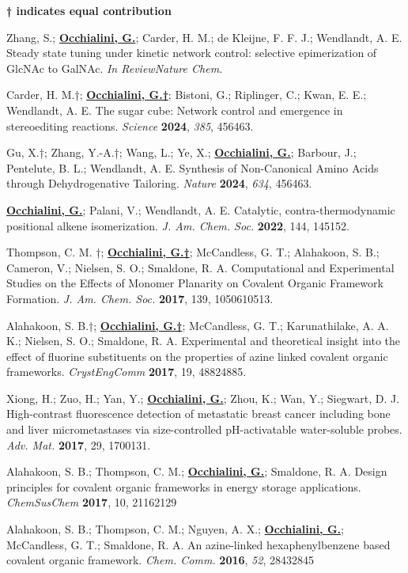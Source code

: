 
\begin{rSection}{}

  \textbf{† indicates equal contribution}

  Zhang, S.; \underline{\textbf{Occhialini, G.}}; Carder, H. M.; de Kleijne, F. F. J.; Wendlandt, A. E. Steady state tuning under kinetic network control: selective epimerization of GlcNAc to GalNAc. \textit{In Review\textemdash{}Nature Chem.}

  Carder, H. M.†; \underline{\textbf{Occhialini, G.†}}; Bistoni, G.; Riplinger, C.; Kwan, E. E.; Wendlandt, A. E. The sugar cube: Network control and emergence in stereoediting reactions. \textit{Science} \textbf{2024}, \textit{385}, 456\textemdash{}463.
  
  Gu, X.†; Zhang, Y.-A.†; Wang, L.; Ye, X.; \underline{\textbf{Occhialini, G.}}; Barbour, J.; Pentelute, B. L.; Wendlandt, A. E. Synthesis of Non-Canonical Amino Acids through Dehydrogenative Tailoring. \textit{Nature} \textbf{2024}, \textit{634}, 456\textemdash{}463.
  
  \underline{\textbf{Occhialini, G.}}; Palani, V.; Wendlandt, A. E. Catalytic, contra-thermodynamic positional alkene isomerization. \textit{J. Am. Chem. Soc.} \textbf{2022}, 144, 145\textemdash{}152.
  
  Thompson, C. M. †; \underline{\textbf{Occhialini, G.†}}; McCandless, G. T.; Alahakoon, S. B.; Cameron, V.; Nielsen, S. O.; Smaldone, R. A. Computational and Experimental Studies on the Effects of Monomer Planarity on Covalent Organic Framework Formation. \textit{J. Am. Chem. Soc.} \textbf{2017}, 139, 10506\textemdash{}10513.
  
  Alahakoon, S. B.†; \underline{\textbf{Occhialini, G.†}}; McCandless, G. T.; Karunathilake, A. A. K.; Nielsen, S. O.; Smaldone, R. A. Experimental and theoretical insight into the effect of fluorine substituents on the properties of azine linked covalent organic frameworks. \textit{CrystEngComm} \textbf{2017}, 19, 4882\textemdash{}4885.
  
  Xiong, H.; Zuo, H.; Yan, Y.; \underline{\textbf{Occhialini, G.}}; Zhou, K.; Wan, Y.; Siegwart, D. J. High-contrast fluorescence detection of metastatic breast cancer including bone and liver micrometastases via size-controlled pH-activatable water-soluble probes. \textit{Adv. Mat.} \textbf{2017}, 29, 1700131.
  
  Alahakoon, S. B.; Thompson, C. M.; \underline{\textbf{Occhialini, G.}}; Smaldone, R. A. Design principles for covalent organic frameworks in energy storage applications. \textit{ChemSusChem} \textbf{2017}, 10, 2116\textemdash{}2129

  Alahakoon, S. B.; Thompson, C. M.; Nguyen, A. X.; \underline{\textbf{Occhialini, G.}}; McCandless, G. T.; Smaldone, R. A. An azine-linked hexaphenylbenzene based covalent organic framework. \textit{Chem. Comm.} \textbf{2016}, \textit{52}, 2843\textemdash{}2845

\end{rSection}
